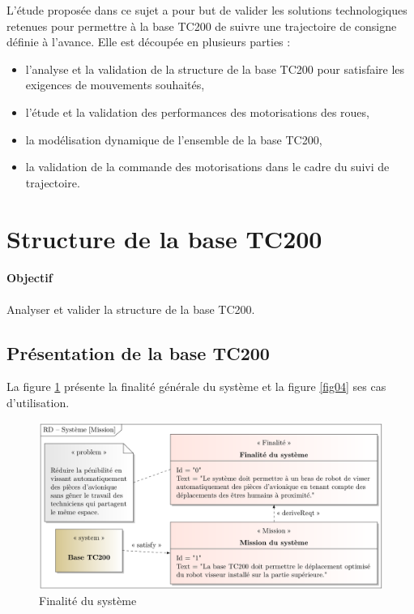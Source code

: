 L'étude proposée dans ce sujet a pour but de valider les solutions technologiques retenues pour permettre à la base TC200 de suivre une trajectoire de consigne définie à l'avance. Elle est découpée en plusieurs parties :
\begin{itemize}
 \item l'analyse et la validation de la structure de la base TC200 pour satisfaire les exigences de mouvements souhaités,
 \item l'étude et la validation des performances des motorisations des roues,
 \item la modélisation dynamique de l'ensemble de la base TC200,
 \item la validation de la commande des motorisations dans le cadre du suivi de trajectoire.
\end{itemize}

\section{Structure de la base TC200}

\paragraph{Objectif} Analyser et valider la structure de la base TC200.

\subsection{Présentation de la base TC200}

La figure \ref{fig03} présente la finalité générale du système et la figure \ref{fig04} ses cas d'utilisation.

\begin{figure}[!ht]
\begin{center}
 \includegraphics[width=0.9\linewidth]{img/fig03.png}
  \caption{Finalité du système}
\label{fig03}
 \end{center}
\end{figure}

